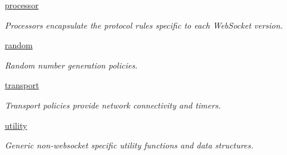 \begin{DoxyCompactItemize}
 \mbox{\hyperlink{namespacewebsocketpp_1_1processor}{processor}}
\begin{DoxyCompactList}\small\item\em Processors encapsulate the protocol rules specific to each Web\+Socket version. \end{DoxyCompactList}\item 
 \mbox{\hyperlink{namespacewebsocketpp_1_1random}{random}}
\begin{DoxyCompactList}\small\item\em Random number generation policies. \end{DoxyCompactList}\item 
 \mbox{\hyperlink{namespacewebsocketpp_1_1transport}{transport}}
\begin{DoxyCompactList}\small\item\em Transport policies provide network connectivity and timers. \end{DoxyCompactList}\item 
 \mbox{\hyperlink{namespacewebsocketpp_1_1utility}{utility}}
\begin{DoxyCompactList}\small\item\em Generic non-\/websocket specific utility functions and data structures. \end{DoxyCompactList}\end{DoxyCompactItemize}
